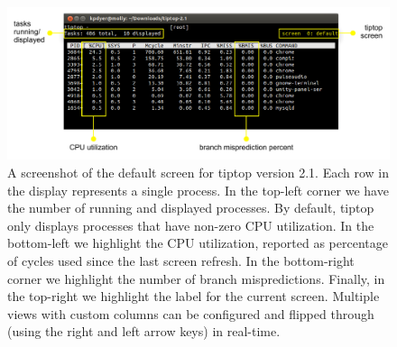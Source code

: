 \begin{figure}[t]
\footnotesize
\centering
\includegraphics[width=1\textwidth]{tiptop-default}
\caption{A screenshot of the default screen for tiptop version 2.1. Each row in the display represents a single process.
In the top-left corner we have the number of running and displayed processes.
By default, tiptop only displays processes that have non-zero CPU utilization.
In the bottom-left we highlight the CPU utilization, reported as percentage of cycles used since the last screen refresh.
In the bottom-right corner we highlight the number of branch mispredictions.
Finally, in the top-right we highlight the label for the current screen.
Multiple views with custom columns can be configured and flipped through (using the right and left arrow keys) in real-time.}
\label{fig:tiptop-default}
\end{figure}